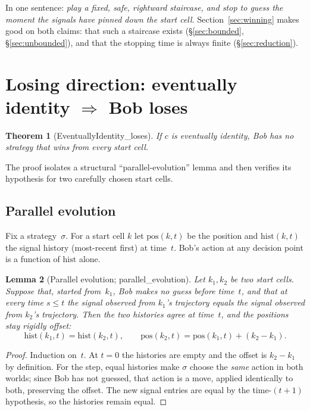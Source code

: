 \documentclass{article}
\newtheorem{theorem}{Theorem}[section]
\newtheorem{lemma}[theorem]{Lemma}
\newcommand{\us}{\discretionary{}{}{}\_\discretionary{}{}{}}
\newcommand{\lean}[1]{{\small\ttfamily #1}}
\begin{document}
In one sentence: \emph{play a fixed, safe, rightward staircase, and stop to
guess the moment the signals have pinned down the start cell.}
Section~\ref{sec:winning} makes good on both claims: that such a staircase
exists (\S\ref{sec:bounded}, \S\ref{sec:unbounded}), and that the stopping
time is always finite (\S\ref{sec:reduction}).

\section{Losing direction: eventually identity \texorpdfstring{$\Rightarrow$}{implies} Bob loses}
\label{sec:losing}

\begin{theorem}[\lean{EventuallyIdentity\us loses}]\label{thm:losing}
If $c$ is eventually identity, Bob has no strategy that wins from every
start cell.
\end{theorem}

The proof isolates a structural ``parallel-evolution'' lemma and then
verifies its hypothesis for two carefully chosen start cells.

\subsection{Parallel evolution}

Fix a strategy~$\sigma$. For a start cell $k$ let $\mathrm{pos}(k,t)$ be
the position and $\mathrm{hist}(k,t)$ the signal history (most-recent
first) at time~$t$. Bob's action at any decision point is a function of
$\mathrm{hist}$ alone.

\begin{lemma}[Parallel evolution; \lean{parallel\us evolution}]\label{lem:parallel}
Let $k_1, k_2$ be two start cells. Suppose that, started from~$k_1$, Bob
makes no guess before time~$t$, and that at every time $s\le t$ the
signal observed from $k_1$'s trajectory equals the signal observed from
$k_2$'s trajectory. Then the two histories agree at time~$t$, and the
positions stay rigidly offset:
\[
  \mathrm{hist}(k_1,t) = \mathrm{hist}(k_2,t),
  \qquad
  \mathrm{pos}(k_2,t) = \mathrm{pos}(k_1,t) + (k_2-k_1).
\]
\end{lemma}
\begin{proof}
Induction on~$t$. At $t=0$ the histories are empty and the offset is
$k_2-k_1$ by definition. For the step, equal histories make $\sigma$
choose the \emph{same} action in both worlds; since Bob has not guessed,
that action is a move, applied identically to both, preserving the
offset. The new signal entries are equal by the time-$(t{+}1)$ hypothesis,
so the histories remain equal.
\end{proof}
\end{document}
